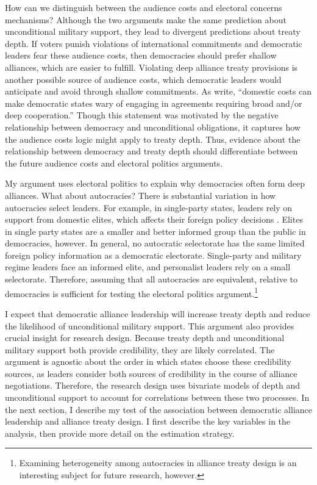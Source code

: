 \documentclass[12pt]{article}
\begin{document}
How can we distinguish between the audience costs and electoral concerns mechanisms? 
Although the two arguments make the same prediction about unconditional military support, they lead to divergent predictions about treaty depth. 
If voters punish violations of international commitments and democratic leaders fear these audience costs, then democracies should prefer shallow alliances, which are easier to fulfill. 
Violating deep alliance treaty provisions is another possible source of audience costs, which democratic leaders would anticipate and avoid through shallow commitments.
As \citet[pg. 980]{Chibaetal2015} write, ``domestic costs can make democratic states wary of engaging in agreements requiring broad and/or deep cooperation.''  
Though this statement was motivated by the negative relationship between democracy and unconditional obligations, it captures how the audience costs logic might apply to treaty depth. 
Thus, evidence about the relationship between democracy and treaty depth should differentiate between the future audience costs and electoral politics arguments. 


My argument uses electoral politics to explain why democracies often form deep alliances. 
What about autocracies? 
There is substantial variation in how autocracies select leaders. 
For example, in single-party states, leaders rely on support from domestic elites, which affects their foreign policy decisions \citep{Weeks2014}.
Elites in single party states are a smaller and better informed group than the public in democracies, however.   
In general, no autocratic selectorate has the same limited foreign policy information as a democratic electorate.
Single-party and military regime leaders face an informed elite, and personalist leaders rely on a small selectorate. 
Therefore, assuming that all autocracies are equivalent, relative to democracies is sufficient for testing the electoral politics argument.\footnote{Examining heterogeneity among autocracies in alliance treaty design is an interesting subject for future research, however.} 


I expect that democratic alliance leadership will increase treaty depth and reduce the likelihood of unconditional military support. 
This argument also provides crucial insight for research design. 
Because treaty depth and unconditional military support both provide credibility, they are likely correlated.
The argument is agnostic about the order in which states choose these credibility sources, as leaders consider both sources of credibility in the course of alliance negotiations. 
Therefore, the research design uses bivariate models of depth and unconditional support to account for correlations between these two processes. 
In the next section, I describe my test of the association between democratic alliance leadership and alliance treaty design. 
I first describe the key variables in the analysis, then provide more detail on the estimation strategy.
\end{document}
